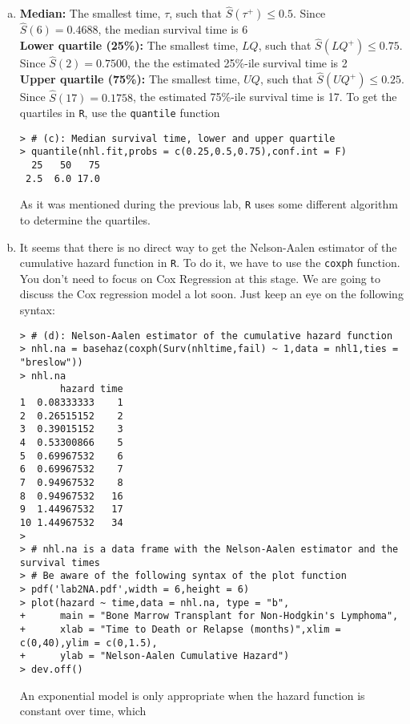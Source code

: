 \begin{enumerate}[(a)]
\item \textbf{Median:} The smallest time, $\tau$, such that $\hat{S}(\tau^+)\leq 0.5$. Since $\hat{S}(6)=0.4688$, the median survival time is 6 \\
\textbf{Lower quartile (25\%):} The smallest time, $LQ$, such that $\hat{S}(LQ^+)\leq 0.75$. Since $\hat{S}(2)=0.7500$, the the estimated 25\%-ile survival time is 2 \\
\textbf{Upper quartile (75\%):} The smallest time, $UQ$, such that $\hat{S}(UQ^+)\leq 0.25$. Since $\hat{S}(17)=0.1758$, the estimated 75\%-ile survival time is 17.
To get the quartiles in \verb|R|, use the \verb|quantile| function
\begin{footnotesize}
\begin{verbatim}
> # (c): Median survival time, lower and upper quartile
> quantile(nhl.fit,probs = c(0.25,0.5,0.75),conf.int = F)
  25   50   75 
 2.5  6.0 17.0
\end{verbatim}
\end{footnotesize}
As it was mentioned during the previous lab, \verb|R| uses some different algorithm to determine the quartiles.
\item It seems that there is no direct way to get the Nelson-Aalen estimator of the cumulative hazard function in \verb|R|. To do it, we have to use the \verb|coxph| function. You don't need to focus on Cox Regression at this stage. We are going to discuss the Cox regression model a lot soon. Just keep an eye on the following syntax:
\begin{footnotesize}
\begin{verbatim}
> # (d): Nelson-Aalen estimator of the cumulative hazard function
> nhl.na = basehaz(coxph(Surv(nhltime,fail) ~ 1,data = nhl1,ties = "breslow"))
> nhl.na
       hazard time
1  0.08333333    1
2  0.26515152    2
3  0.39015152    3
4  0.53300866    5
5  0.69967532    6
6  0.69967532    7
7  0.94967532    8
8  0.94967532   16
9  1.44967532   17
10 1.44967532   34
> 
> # nhl.na is a data frame with the Nelson-Aalen estimator and the survival times
> # Be aware of the following syntax of the plot function
> pdf('lab2NA.pdf',width = 6,height = 6)
> plot(hazard ~ time,data = nhl.na, type = "b",
+      main = "Bone Marrow Transplant for Non-Hodgkin's Lymphoma",
+      xlab = "Time to Death or Relapse (months)",xlim = c(0,40),ylim = c(0,1.5),
+      ylab = "Nelson-Aalen Cumulative Hazard")
> dev.off()
\end{verbatim}
\end{footnotesize}
An exponential model is only appropriate when the hazard function is constant over time, which 

\end{enumerate}
